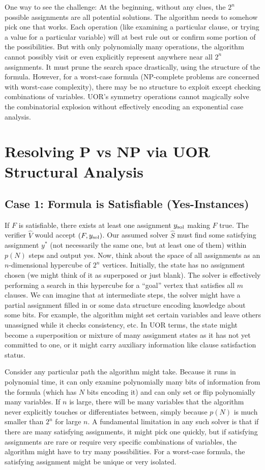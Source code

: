 \documentclass[11pt]{article}
\begin{document}
One way to see the challenge: At the beginning, without any clues, the \(2^n\) possible assignments are all potential solutions. The algorithm needs to somehow pick one that works. Each operation (like examining a particular clause, or trying a value for a particular variable) will at best rule out or confirm some portion of the possibilities. But with only polynomially many operations, the algorithm cannot possibly visit or even explicitly represent anywhere near all \(2^n\) assignments. It must prune the search space drastically, using the structure of the formula. However, for a worst-case formula (NP-complete problems are concerned with worst-case complexity), there may be no structure to exploit except checking combinations of variables. UOR’s symmetry operations cannot magically solve the combinatorial explosion without effectively encoding an exponential case analysis.

\section{Resolving P vs NP via UOR Structural Analysis}

\subsection{Case 1: Formula is Satisfiable (Yes-Instances)}
If \(F\) is satisfiable, there exists at least one assignment \(y_{\rm sol}\) making \(F\) true. The verifier \(\hat{V}\) would accept \((F, y_{\rm sol})\). Our assumed solver \(\hat{S}\) must find some satisfying assignment \(y^*\) (not necessarily the same one, but at least one of them) within \(p(N)\) steps and output yes. Now, think about the space of all assignments as an \(n\)-dimensional hypercube of \(2^n\) vertices. Initially, the state has no assignment chosen (we might think of it as superposed or just blank). The solver is effectively performing a search in this hypercube for a “goal” vertex that satisfies all \(m\) clauses. We can imagine that at intermediate steps, the solver might have a partial assignment filled in or some data structure encoding knowledge about some bits. For example, the algorithm might set certain variables and leave others unassigned while it checks consistency, etc. In UOR terms, the state might become a superposition or mixture of many assignment states as it has not yet committed to one, or it might carry auxiliary information like clause satisfaction status.

Consider any particular path the algorithm might take. Because it runs in polynomial time, it can only examine polynomially many bits of information from the formula (which has \(N\) bits encoding it) and can only set or flip polynomially many variables. If \(n\) is large, there will be many variables that the algorithm never explicitly touches or differentiates between, simply because \(p(N)\) is much smaller than \(2^n\) for large \(n\). A fundamental limitation in any such solver is that if there are many satisfying assignments, it might pick one quickly, but if satisfying assignments are rare or require very specific combinations of variables, the algorithm might have to try many possibilities. For a worst-case formula, the satisfying assignment might be unique or very isolated.
\end{document}
